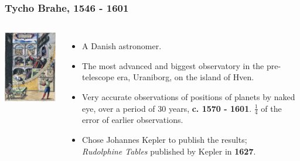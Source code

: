 \documentclass[aspectratio=169,xcolor=pdftex,dvipsnames]{beamer} %
\begin{document}
\begin{frame}
\frametitle{Tycho Brahe, 1546 - 1601}

\centering
\begin{columns}
       
\includegraphics[width=55mm]{tychoQuadrant.jpg} 
\begin{itemize}
\item
A Danish astronomer.
\item
The most advanced and biggest observatory in the pre-telescope era, 
Uraniborg, on the island of Hven.
\item
Very accurate observations of positions of planets by naked eye, over a period of 30 years,
\textbf{c. 1570 - 1601}. $\frac{1}{4}$ of the error of earlier observations.
\item
Chose Johannes Kepler to publish the results;\\
 \textit{Rudolphine Tables}
published by Kepler in \textbf{1627}.
\end{itemize}
   
\end{columns} 

\end{frame}
\end{document}
